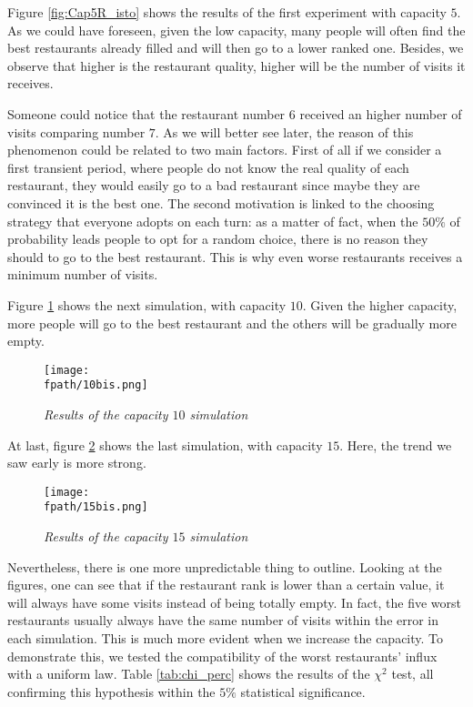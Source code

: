 \documentclass[10pt,a4paper,usenatbib]{article}
\newcommand{\fpath}{./Figs/}
\begin{document}
Figure \ref{fig:Cap5R_isto} shows the results of the first experiment with capacity $5$. As we could have foreseen, given the low capacity, many people will often find the best restaurants already filled and will then go to a lower ranked one. 
Besides, we observe that higher is the restaurant quality, higher will be the number of visits it receives.

Someone could notice that the restaurant number $6$ received an higher number of visits comparing number $7$. As we will better see later, the reason of this phenomenon could be related to two main factors. First of all if we consider a first transient period, where people do not know the real quality of each restaurant, they would easily go to a bad restaurant since maybe they are convinced it is the best one. The second motivation is linked to the choosing strategy that everyone adopts on each turn: as a matter of fact, when the $50\%$ of probability leads people to opt for a random choice, there is no reason they should to go to the best restaurant. This is why even worse restaurants receives a minimum number of visits.

Figure \ref{fig:Cap10R_isto} shows the next simulation, with capacity $10$. Given the higher capacity, more people will go to the best restaurant and the others will be gradually more empty.

\begin{figure}[!htb]
\centering
\texttt{[image: \\fpath/10bis.png]}
\caption{\small \textit{Results of the capacity $10$ simulation}}
\label{fig:Cap10R_isto}
\end{figure}

At last, figure \ref{fig:Cap15R_isto} shows the last simulation, with capacity $15$. Here, the trend we saw early is more strong.

\begin{figure}[!htb]
\centering
\texttt{[image: \\fpath/15bis.png]}
\caption{\small \textit{Results of the capacity $15$ simulation}}
\label{fig:Cap15R_isto}
\end{figure}

Nevertheless, there is one more unpredictable thing to outline. Looking at the figures, one can see that if the restaurant rank is lower than a certain value, it will always have some visits instead of being totally empty. In fact, the five worst restaurants usually always have the same number of visits within the error in each simulation.  This is much more evident when we increase the capacity.
To demonstrate this, we tested the compatibility of the worst restaurants' influx with a uniform law. Table \ref{tab:chi_perc} shows the results of the $\chi^2$ test, all confirming this hypothesis within the $5\%$ statistical significance.
\end{document}
